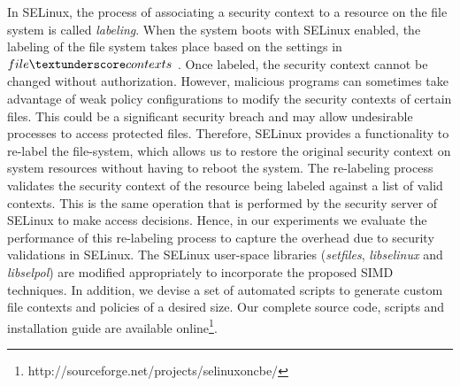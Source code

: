 \documentclass[conference]{IEEEtran}
\begin{document}
In SELinux, the process of associating a security context to a
resource on the file system is called \emph{labeling}.  When the
system boots with SELinux enabled, the labeling of the file system
takes place based on the settings in $file\textunderscore contexts$
\cite{selinuxBook}.  Once labeled, the security context cannot be
changed without authorization.  However, malicious programs can
sometimes take advantage of weak policy configurations to modify the
security contexts of certain files.  This could be a significant
security breach and may allow undesirable processes to access
protected files.  Therefore, SELinux provides a functionality to
re-label the file-system, which allows us to restore the original
security context on system resources without having to reboot the
system.  The re-labeling process validates the security context of the
resource being labeled against a list of valid contexts.  This is the
same operation that is performed by the security server of SELinux to
make access decisions.  Hence, in our experiments we evaluate the
performance of this re-labeling process to capture the overhead due to
security validations in SELinux.  The SELinux user-space libraries
(\emph{setfiles}, \emph{libselinux} and \emph{libselpol}) are modified
appropriately to incorporate the proposed SIMD techniques.  In
addition, we devise a set of automated scripts to generate custom file
contexts and policies of a desired size.  Our complete source code,
scripts and installation guide are available
online\footnote{http://sourceforge.net/projects/selinuxoncbe/}.
\end{document}

